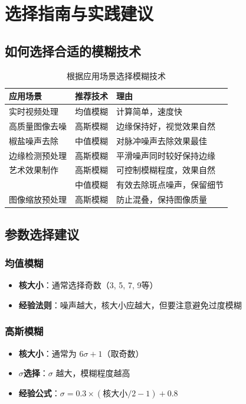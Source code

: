 \documentclass{article}
\begin{document}
\section{选择指南与实践建议}

\subsection{如何选择合适的模糊技术}

\begin{table}[h]
\centering
\caption{根据应用场景选择模糊技术}
\begin{tabular}{|p{}|p{}|p{}|}
\hline
\textbf{应用场景} & \textbf{推荐技术} & \textbf{理由} \\
\hline
实时视频处理 & 均值模糊 & 计算简单，速度快 \\
\hline
高质量图像去噪 & 高斯模糊 & 边缘保持好，视觉效果自然 \\
\hline
椒盐噪声去除 & 中值模糊 & 对脉冲噪声去除效果最佳 \\
\hline
边缘检测预处理 & 高斯模糊 & 平滑噪声同时较好保持边缘 \\
\hline
艺术效果制作 & 高斯模糊 & 可控制模糊程度，效果自然 \\
 & 中值模糊 & 有效去除斑点噪声，保留细节 \\
\hline
图像缩放预处理 & 高斯模糊 & 防止混叠，保持图像质量 \\
\hline
\end{tabular}
\end{table}

\subsection{参数选择建议}

\subsubsection{均值模糊}
\begin{itemize}
    \item \textbf{核大小}：通常选择奇数（3, 5, 7, 9等）
    \item \textbf{经验法则}：噪声越大，核大小应越大，但要注意避免过度模糊
\end{itemize}

\subsubsection{高斯模糊}
\begin{itemize}
    \item \textbf{核大小}：通常为 $6\sigma + 1$（取奇数）
    \item \textbf{$\sigma$选择}：$\sigma$ 越大，模糊程度越高
    \item \textbf{经验公式}：$\sigma = 0.3 \times (\text{核大小}/2 - 1) + 0.8$
\end{itemize}
\end{document}
